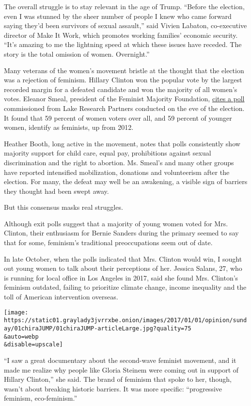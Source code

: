 The overall struggle is to stay relevant in the age of Trump. ``Before
the election, even I was stunned by the sheer number of people I knew
who came forward saying they'd been survivors of sexual assault,'' said
Vivien Labaton, co-executive director of Make It Work, which promotes
working families' economic security. ``It's amazing to me the lightning
speed at which these issues have receded. The story is the total
omission of women. Overnight.''

Many veterans of the women's movement bristle at the thought that the
election was a rejection of feminism. Hillary Clinton won the popular
vote by the largest recorded margin for a defeated candidate and won the
majority of all women's votes. Eleanor Smeal, president of the Feminist
Majority Foundation,
\href{http://msmagazine.com/blog/2016/12/22/numbers-gender-feminism-2016-presidential-election/}{cites
a poll} commissioned from Lake Research Partners conducted on the eve of
the election. It found that 59 percent of women voters over all, and 59
percent of younger women, identify as feminists, up from 2012.

Heather Booth, long active in the movement, notes that polls
consistently show majority support for child care, equal pay,
prohibitions against sexual discrimination and the right to abortion.
Ms. Smeal's and many other groups have reported intensified
mobilization, donations and volunteerism after the election. For many,
the defeat may well be an awakening, a visible sign of barriers they
thought had been swept away.

But this consensus masks real struggles.

Although exit polls suggest that a majority of young women voted for
Mrs. Clinton, their enthusiasm for Bernie Sanders during the primary
seemed to say that for some, feminism's traditional preoccupations seem
out of date.

In late October, when the polls indicated that Mrs. Clinton would win, I
sought out young women to talk about their perceptions of her. Jessica
Salans, 27, who is running for local office in Los Angeles in 2017, said
she found Mrs. Clinton's feminism outdated, failing to prioritize
climate change, income inequality and the toll of American intervention
overseas.

\texttt{[image: https://static01.graylady3jvrrxbe.onion/images/2017/01/01/opinion/sunday/01chiraJUMP/01chiraJUMP-articleLarge.jpg?quality=75\\\&auto=webp\\\&disable=upscale]}

``I saw a great documentary about the second-wave feminist movement, and
it made me realize why people like Gloria Steinem were coming out in
support of Hillary Clinton,'' she said. The brand of feminism that spoke
to her, though, wasn't about breaking historic barriers. It was more
specific: ``progressive feminism, eco-feminism.''

